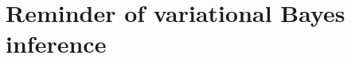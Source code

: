 \documentclass[10pt]{beamer}
\begin{document}

\section{Reminder of variational Bayes inference}
\end{document}
